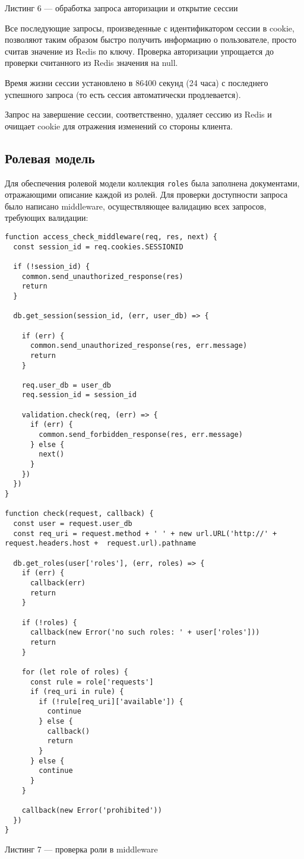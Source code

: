 \documentclass[14pt]{extarticle}
\begin{document}
\begin{center}
Листинг 6 --- обработка запроса авторизации и открытие сессии
\end{center}
Все последующие запросы, произведенные с идентификатором сессии в cookie, позволяют таким образом быстро получить информацию о пользователе, просто считав значение из Redis по ключу. Проверка авторизации упрощается до проверки считанного из Redis значения на null.

Время жизни сессии установлено в 86400 секунд (24 часа) с последнего успешного запроса (то есть сессия автоматически продлевается).

Запрос на завершение сессии, соответственно, удаляет сессию из Redis и очищает cookie для отражения изменений со стороны клиента.


\subsection{Ролевая модель}
Для обеспечения ролевой модели коллекция \texttt{roles} была заполнена документами, отражающими описание каждой из ролей. Для проверки доступности запроса было написано middleware, осуществляющее валидацию всех запросов, требующих валидации:
\begin{lstlisting}
function access_check_middleware(req, res, next) {
  const session_id = req.cookies.SESSIONID

  if (!session_id) {
    common.send_unauthorized_response(res)
    return
  }

  db.get_session(session_id, (err, user_db) => {

    if (err) {
      common.send_unauthorized_response(res, err.message)
      return
    }

    req.user_db = user_db
    req.session_id = session_id

    validation.check(req, (err) => {
      if (err) {
        common.send_forbidden_response(res, err.message)
      } else {
        next()
      }
    })
  })
}

function check(request, callback) {
  const user = request.user_db
  const req_uri = request.method + ' ' + new url.URL('http://' + request.headers.host +  request.url).pathname

  db.get_roles(user['roles'], (err, roles) => {
    if (err) {
      callback(err)
      return
    }

    if (!roles) {
      callback(new Error('no such roles: ' + user['roles']))
      return
    }

    for (let role of roles) {
      const rule = role['requests']
      if (req_uri in rule) {
        if (!rule[req_uri]['available']) {
          continue
        } else {
          callback()
          return
        }
      } else {
        continue
      }
    }

    callback(new Error('prohibited'))
  })
}
\end{lstlisting}
\begin{center}
Листинг 7 --- проверка роли в middleware
\end{center}
\end{document}
